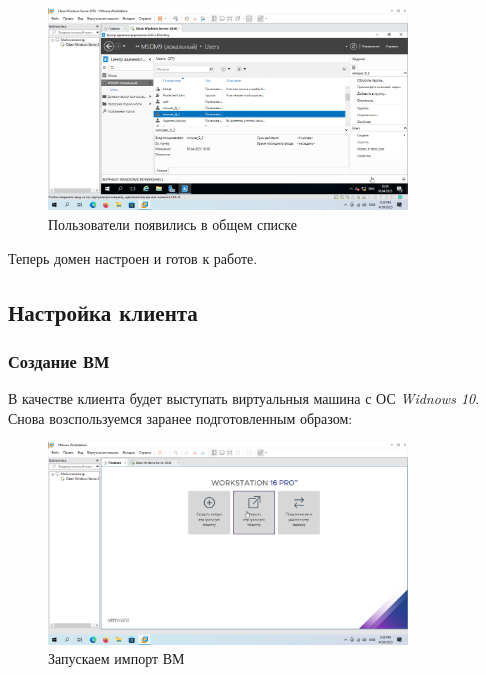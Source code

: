 \documentclass[a4paper]{article}
\begin{document}
  \begin{figure}[H]
    \centering
    \includegraphics[width=0.85\textwidth]{Screenshot_76}
    \caption{Пользователи появились в общем списке}
    \label{img:76}
  \end{figure}

  Теперь домен настроен и готов к работе.

  \subsection{Настройка клиента}

  \subsubsection{Создание ВМ}

  В качестве клиента будет выступать виртуальныя машина с ОС \textit{Widnows 10}.
  Снова возспользуемся заранее подготовленным образом:

  \begin{figure}[H]
    \centering
    \includegraphics[width=0.85\textwidth]{Screenshot_77}
    \caption{Запускаем импорт ВМ}
    \label{img:77}
  \end{figure}
\end{document}
